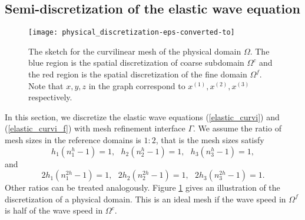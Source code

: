 \subsection{Semi-discretization of the elastic wave equation}\label{semi_discrete_form}

\begin{figure}[htbp]
	\centering
\texttt{[image: physical\_discretization-eps-converted-to]}
	\caption{The sketch for the curvilinear mesh of the physical domain $\Omega$. The blue region is the spatial discretization of coarse subdomain $\Omega^c$ and the red region is the spatial discretization of the fine domain $\Omega^f$. Note that $x,y,z$ in the graph correspond to $x^{(1)}, x^{(2)}, x^{(3)}$ respectively. 
	 }\label{physical_discretization}
\end{figure}

In this section, we discretize the elastic wave equations (\ref{elastic_curvi}) and  (\ref{elastic_curvi_f}) with mesh refinement interface $\Gamma$. We assume the ratio of mesh sizes in the reference domains is $1:2$, that is the mesh sizes satisfy
\[h_1(n_1^h-1) = 1, \ \ \ h_2(n_2^h-1) = 1, \ \ \ h_3(n_3^h-1) = 1,\]
and
\[2h_1(n_1^{2h}-1) = 1, \ \ \ 2h_2(n_2^{2h}-1) = 1, \ \ \ 2h_3(n_3^{2h}-1) = 1.\]
 Other ratios can be treated analogously. Figure \ref{physical_discretization} gives an illustration of the discretization of a physical domain. This is an ideal mesh if the wave speed in $\Omega^f$ is half of the wave speed in $\Omega^c$.

